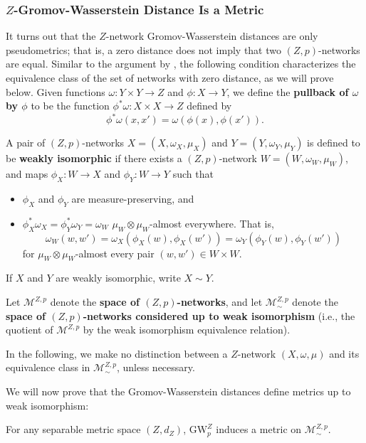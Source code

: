 \documentclass[twoside,11pt]{article}
\theoremstyle{definition}
\newcommand{\M}{\mathcal{M}}
\newcommand{\MZp}{\M_{\sim}^{Z,p}}
\newcommand{\dgwz}{\mathrm{GW}_p^Z}
\newcommand{\define}[1]{\textbf{#1}}
\begin{document}
\subsubsection{\texorpdfstring{$Z$}{Z}-Gromov-Wasserstein Distance Is a Metric}

It turns out that the $Z$-network Gromov-Wasserstein distances are only pseudometrics; that is, a zero distance does not imply that two $(Z,p)$-networks are equal. Similar to the argument by \citet{chowdhury2019gromov}, the following condition characterizes the equivalence class of the set of networks with zero distance, as we will prove below. Given functions $\omega:Y \times Y \to Z$ and $\phi:X \to Y$, we define the \define{pullback of $\omega$ by $\phi$} to be the function $\phi^\ast \omega:X \times X \to Z$ defined by 
\[
\phi^\ast \omega(x,x') = \omega(\phi(x),\phi(x')).
\]

\begin{definition}\label{def:weak_isomorphism}
    A pair of $(Z,p)$-networks $X = (X,\omega_X,\mu_X)$ and $Y=(Y,\omega_Y,\mu_Y)$ is defined to be \define{weakly isomorphic} if there exists a $(Z,p)$-network $W = (W,\omega_W,\mu_W)$, and maps $\phi_X:W \to X$ and $\phi_Y:W \to Y$ such that
    \begin{itemize}
        \item $\phi_X$ and $\phi_Y$ are measure-preserving, and
        \item $\phi_X^\ast \omega_X = \phi_Y^\ast \omega_Y = \omega_W$ $\mu_W \otimes \mu_W$-almost everywhere. That is,
              \[
                  \omega_W(w,w') = \omega_X(\phi_X(w),\phi_X(w')) = \omega_Y(\phi_Y(w),\phi_Y(w'))
              \]
              for $\mu_W \otimes \mu_W$-almost every pair $(w,w') \in W \times W$.
    \end{itemize}
    If $X$ and $Y$ are weakly isomorphic, write $X \sim Y$.

    Let $\M^{Z,p}$ denote the \define{space of $(Z,p)$-networks}, and let $\MZp$ denote the \define{space of $(Z,p)$-networks considered up to weak isomorphism} (i.e., the quotient of $\M^{Z,p}$ by the weak isomorphism equivalence relation). 
\end{definition}

 In the following, we make no distinction between a $Z$-network $(X,\omega,\mu)$ and its equivalence class in $\MZp$, unless necessary.

We will now prove that the Gromov-Wasserstein distances define metrics up to weak isomorphism:
\begin{theorem}\label{thm:ZGW_is_a_metric}
    For any separable metric space $(Z,d_Z)$, $\dgwz$ induces a metric on $\MZp$.
\end{theorem}
 
\end{document}
